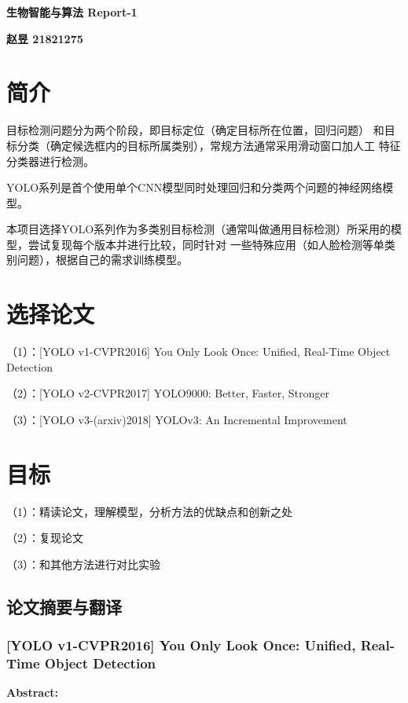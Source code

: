 \documentclass[a4paper, notitlepage]{article}
\begin{document}
\setlength{\parindent}{0pt}
\begin{center}
	\LARGE\textbf{生物智能与算法 Report-1}
\end{center}
\vspace{1em}

\begin{center}
	\textbf{赵昱 21821275}
\end{center}

\setlength{\parindent}{2em}

\section{简介}
目标检测问题分为两个阶段，即目标定位（确定目标所在位置，回归问题）
和目标分类（确定候选框内的目标所属类别），常规方法通常采用滑动窗口加人工
特征分类器进行检测。

YOLO系列\cite{1,2,3}是首个使用单个CNN模型同时处理回归和分类两个问题的神经网络模型。

本项目选择YOLO系列作为多类别目标检测（通常叫做通用目标检测）所采用的模型，尝试复现每个版本并进行比较，同时针对
一些特殊应用（如人脸检测等单类别问题），根据自己的需求训练模型。

\section{选择论文}
（1）：[YOLO v1-CVPR2016] You Only Look Once: Unified, Real-Time Object Detection

（2）：[YOLO v2-CVPR2017] YOLO9000: Better, Faster, Stronger

（3）：[YOLO v3-(arxiv)2018] YOLOv3: An Incremental Improvement

\section{目标}
（1）：精读论文，理解模型，分析方法的优缺点和创新之处

（2）：复现论文

（3）：和其他方法进行对比实验

\subsection{论文摘要与翻译}
\subsubsection{[YOLO v1-CVPR2016] You Only Look Once: Unified, Real-Time Object Detection}
\textbf{Abstract:}
\end{document}
